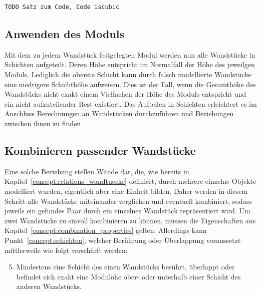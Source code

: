 \begin{lstlisting}[language=Python, caption=Überprüfen der extrahierten Wandstücke auf Quaderförmigkeit.]
  TODO Satz zum Code, Code iscubic
\end{lstlisting}

\subsection{Anwenden des Moduls}
Mit dem zu jedem Wandstück festgelegten Modul werden nun alle Wandstücke in Schichten aufgeteilt.
Deren Höhe entspricht im Normalfall der Höhe des jeweilgen Moduls.
Lediglich die oberste Schicht kann durch falsch modellierte Wandstücke eine niedrigere Schichthöhe aufweisen.
Dies ist der Fall, wenn die Gesamthöhe des Wandstücks nicht exakt einem Vielfachen der Höhe des Moduls entspricht und ein nicht aufzuteilender Rest existiert.
Das Aufteilen in Schichten erleichtert es im Anschluss Berechnungen an Wandstücken durchzuführen und Beziehungen zwischen ihnen zu finden.

\subsection{Kombinieren passender Wandstücke}
\label{real:combination}
Eine solche Beziehung stellen Wände dar, die, wie bereits in Kapitel~\ref{concept:relations_wandtuecke} definiert, durch mehrere einzelne Objekte modelliert wurden, eigentlich aber eine Einheit bilden.
Daher werden in diesem Schritt alle Wandstücke miteinander verglichen und eventuell kombiniert, sodass jeweils ein gefundes Paar durch ein einzelnes Wandstück repräsentiert wird.
Um zwei Wandstücke zu sinvoll kombinieren zu können, müssen die Eigenschaften aus Kapitel~\ref{concept:combination_properties} gelten.
Allerdings kann Punkt~\ref{concept:schichten}, welcher Berührung oder Überlappung voraussetzt mittlerweile wie folgt verschärft werden:

\begin{enumerate}
\setcounter{enumi}{4}
\item\label{real:schichten} Mindestens eine Schicht des einen Wandstücks berührt, überlappt oder befindet sich exakt eine Modulöhe ober- oder unterhalb einer Schicht des anderen Wandstücks.
\end{enumerate}

